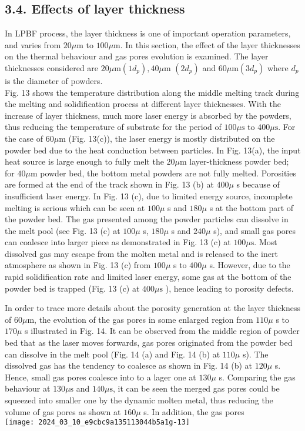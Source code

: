 \documentclass[10pt]{article}
\begin{document}
\subsection*{3.4. Effects of layer thickness}
In LPBF process, the layer thickness is one of important operation parameters, and varies from $20 \mu \mathrm{m}$ to $100 \mu \mathrm{m}$. In this section, the effect of the layer thicknesses on the thermal behaviour and gas pores evolution is examined. The layer thicknesses considered are $20 \mu \mathrm{m}\left(1 d_{p}\right), 40 \mu \mathrm{m}$ $\left(2 d_{p}\right)$ and $60 \mu \mathrm{m}\left(3 d_{p}\right)$ where $d_{p}$ is the diameter of powders.\\
Fig. 13 shows the temperature distribution along the middle melting track during the melting and solidification process at different layer thicknesses. With the increase of layer thickness, much more laser energy is absorbed by the powders, thus reducing the temperature of substrate for the period of $100 \mu \mathrm{s}$ to $400 \mu \mathrm{s}$. For the case of $60 \mu \mathrm{m}$ (Fig. 13(c)), the laser energy is mostly distributed on the powder bed due to the heat conduction between particles. In Fig. 13(a), the input heat source is large enough to fully melt the $20 \mu \mathrm{m}$ layer-thickness powder bed; for $40 \mu \mathrm{m}$ powder bed, the bottom metal powders are not fully melted. Porosities are formed at the end of the track shown in Fig. 13 (b) at $400 \mu$ s because of insufficient laser energy. In Fig. 13 (c), due to limited energy source, incomplete melting is serious which can be seen at $100 \mu$ s and $180 \mu$ s at the bottom part of the powder bed. The gas presented among the powder particles can dissolve in the melt pool (see Fig. 13 (c) at $100 \mu$ s, $180 \mu$ s and $240 \mu$ s), and small gas pores can coalesce into larger piece as demonstrated in Fig. 13 (c) at $100 \mu \mathrm{s}$. Most dissolved gas may escape from the molten metal and is released to the inert atmosphere as shown in Fig. 13 (c) from $100 \mu$ s to $400 \mu$ s. However, due to the rapid solidification rate and limited laser energy, some gas at the bottom of the powder bed is trapped (Fig. 13 (c) at $400 \mu \mathrm{s}$ ), hence leading to porosity defects.

In order to trace more details about the porosity generation at the layer thickness of $60 \mu \mathrm{m}$, the evolution of the gas pores in some enlarged region from $110 \mu$ s to $170 \mu$ s illustrated in Fig. 14. It can be observed from the middle region of powder bed that as the laser moves forwards, gas pores originated from the powder bed can dissolve in the melt pool (Fig. 14 (a) and Fig. 14 (b) at $110 \mu$ s). The dissolved gas has the tendency to coalesce as shown in Fig. 14 (b) at $120 \mu$ s. Hence, small gas pores coalesce into to a lager one at $130 \mu$ s. Comparing the gas behaviour at $130 \mu \mathrm{s}$ and $140 \mu \mathrm{s}$, it can be seen the merged gas pores could be squeezed into smaller one by the dynamic molten metal, thus reducing the volume of gas pores as shown at $160 \mu$ s. In addition, the gas pores\\
\texttt{[image: 2024\_03\_10\_e9cbc9a135113044b5a1g-13]}
\end{document}
